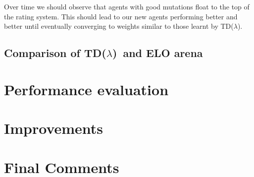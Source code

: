 \documentclass[11pt]{article}
\newcommand{\tdl}{TD($\lambda$)}
\begin{document}
Over time we should observe that agents with good mutations float to the top of the rating system.
This should lead to our new agents performing better and better until eventually
converging to weights similar to those learnt by \tdl.

\subsection{Comparison of \tdl\ and ELO arena}
\label{sub:comparing_learning}

\section{Performance evaluation}
\label{sec:performance}

\section{Improvements}
\label{sec:improvements}

\section{Final Comments}
\label{sec:final_comments}




\end{document}
